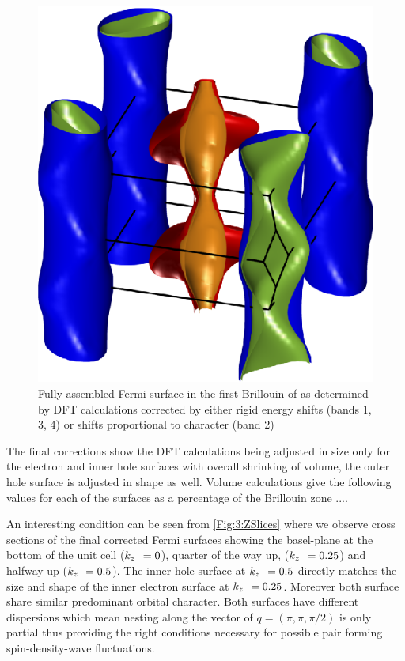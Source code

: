 \begin{figure}[htbp]
    \begin{center}
        \includegraphics[scale=0.7]{Chapter3-dHvABaFe2P2/Figures/AngleDepMeasurements/BandCharacterFermiSurface/FullBandCharacterFermiSurface}
        \caption{Fully assembled Fermi surface in the first Brillouin of \BaFeP as determined by DFT calculations corrected by either rigid energy shifts (bands 1, 3, 4) or shifts proportional to \DzTwo character (band 2)}
        \label{Fig:3:FullBandCharacterFermiSurface}
    \end{center}
\end{figure}

The final corrections show the DFT calculations being adjusted in size only for the electron and inner hole surfaces with overall shrinking of volume, the outer hole surface is adjusted in shape as well. Volume calculations give the following values for each of the surfaces as a percentage of the Brillouin zone ....


An interesting condition can be seen from \fig\ref{Fig:3:ZSlices} where we observe cross sections of the final corrected Fermi surfaces showing the basel-plane at the bottom of the unit cell ($\kz=0$), quarter of the way up, ($\kz=0.25$) and halfway up ($\kz=0.5$). The inner hole surface at $\kz=0.5$ directly matches the size and shape of the inner electron surface at $\kz=0.25$. Moreover both surface share similar predominant \DxzDyz orbital character. Both surfaces have different \kz dispersions which mean nesting along the vector of $q=(\pi, \pi, \pi/2)$ is only partial thus providing the right conditions necessary for possible pair forming spin-density-wave fluctuations.

